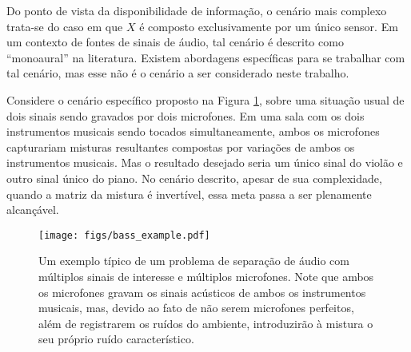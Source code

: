 


Do ponto de vista da disponibilidade de informação, o cenário mais complexo trata-se do caso em que $X$ é composto exclusivamente por um único sensor. Em um contexto de fontes de sinais de áudio, tal cenário é descrito como ``monoaural'' na literatura. Existem abordagens específicas para se trabalhar com tal cenário, mas esse não é o cenário a ser considerado neste trabalho.


Considere o cenário específico proposto na Figura \ref{fig:bass_example}, sobre uma situação usual de dois sinais sendo gravados por dois microfones. Em uma sala com os dois instrumentos musicais sendo tocados simultaneamente, ambos os microfones capturariam misturas resultantes compostas por variações de ambos os instrumentos musicais. Mas o resultado desejado seria um único sinal do violão e outro sinal único do piano. No cenário descrito, apesar de sua complexidade, quando a matriz da mistura é invertível, essa meta passa a ser plenamente alcançável.

\begin{figure}[H]
    \centering
    \texttt{[image: figs/bass\_example.pdf]}
    \caption{Um exemplo típico de um problema de separação de áudio com múltiplos sinais de interesse e múltiplos microfones. Note que ambos os microfones gravam os sinais acústicos de ambos os instrumentos musicais, mas, devido ao fato de não serem microfones perfeitos, além de registrarem os ruídos do ambiente, introduzirão à mistura o seu próprio ruído característico.}
    \label{fig:bass_example}
\end{figure}

